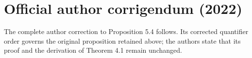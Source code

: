 \section*{Official author corrigendum (2022)}
The complete author correction to Proposition 5.4 follows. Its corrected quantifier order governs the original proposition retained above; the authors state that its proof and the derivation of Theorem 4.1 remain unchanged.
